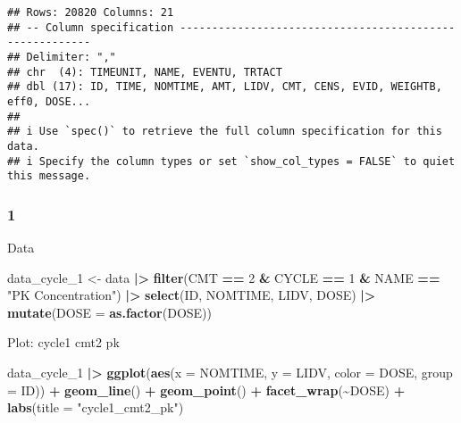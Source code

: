 \documentclass[
]{article}
\newenvironment{Shaded}{\begin{snugshade}}{\end{snugshade}}
\newcommand{\AttributeTok}[1]{\textcolor[rgb]{0.13,0.29,0.53}{#1}}
\newcommand{\DecValTok}[1]{\textcolor[rgb]{0.00,0.00,0.81}{#1}}
\newcommand{\FunctionTok}[1]{\textcolor[rgb]{0.13,0.29,0.53}{\textbf{#1}}}
\newcommand{\NormalTok}[1]{#1}
\newcommand{\OtherTok}[1]{\textcolor[rgb]{0.56,0.35,0.01}{#1}}
\newcommand{\SpecialCharTok}[1]{\textcolor[rgb]{0.81,0.36,0.00}{\textbf{#1}}}
\newcommand{\StringTok}[1]{\textcolor[rgb]{0.31,0.60,0.02}{#1}}
\begin{document}
\begin{verbatim}
## Rows: 20820 Columns: 21
## -- Column specification --------------------------------------------------------
## Delimiter: ","
## chr  (4): TIMEUNIT, NAME, EVENTU, TRTACT
## dbl (17): ID, TIME, NOMTIME, AMT, LIDV, CMT, CENS, EVID, WEIGHTB, eff0, DOSE...
## 
## i Use `spec()` to retrieve the full column specification for this data.
## i Specify the column types or set `show_col_types = FALSE` to quiet this message.
\end{verbatim}

\hypertarget{section-1}{%
\subsubsection{1}\label{section-1}}

Data

\begin{Shaded}
\begin{Highlighting}[]
\NormalTok{data\_cycle\_1 }\OtherTok{\textless{}{-}}\NormalTok{ data }\SpecialCharTok{|\textgreater{}}
  \FunctionTok{filter}\NormalTok{(CMT }\SpecialCharTok{==} \DecValTok{2} \SpecialCharTok{\&}\NormalTok{ CYCLE }\SpecialCharTok{==} \DecValTok{1} \SpecialCharTok{\&}\NormalTok{ NAME }\SpecialCharTok{==} \StringTok{"PK Concentration"}\NormalTok{) }\SpecialCharTok{|\textgreater{}}
  \FunctionTok{select}\NormalTok{(ID, NOMTIME, LIDV, DOSE) }\SpecialCharTok{|\textgreater{}}
  \FunctionTok{mutate}\NormalTok{(}\AttributeTok{DOSE =} \FunctionTok{as.factor}\NormalTok{(DOSE))}
\end{Highlighting}
\end{Shaded}

Plot: cycle1 cmt2 pk

\begin{Shaded}
\begin{Highlighting}[]
\NormalTok{data\_cycle\_1 }\SpecialCharTok{|\textgreater{}}
  \FunctionTok{ggplot}\NormalTok{(}\FunctionTok{aes}\NormalTok{(}\AttributeTok{x =}\NormalTok{ NOMTIME, }\AttributeTok{y =}\NormalTok{ LIDV, }\AttributeTok{color =}\NormalTok{ DOSE, }\AttributeTok{group =}\NormalTok{ ID)) }\SpecialCharTok{+} \FunctionTok{geom\_line}\NormalTok{() }\SpecialCharTok{+}
  \FunctionTok{geom\_point}\NormalTok{() }\SpecialCharTok{+} \FunctionTok{facet\_wrap}\NormalTok{(}\SpecialCharTok{\textasciitilde{}}\NormalTok{DOSE) }\SpecialCharTok{+} \FunctionTok{labs}\NormalTok{(}\AttributeTok{title =} \StringTok{"cycle1\_cmt2\_pk"}\NormalTok{)}
\end{Highlighting}
\end{Shaded}
\end{document}
